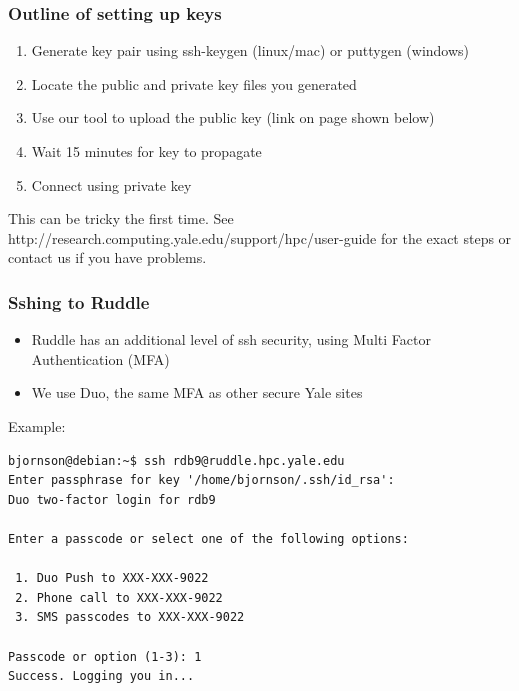 \documentclass[10pt]{beamer}
\begin{document}
\begin{frame}[fragile]

\frametitle{Outline of setting up keys}
\begin{enumerate}
\item Generate key pair using ssh-keygen (linux/mac) or puttygen (windows)
\item Locate the public and private key files you generated
\item Use our tool to upload the public key (link on page shown below)
\item Wait 15 minutes for key to propagate
\item Connect using private key
\end{enumerate}

This can be tricky the first time.  See http://research.computing.yale.edu/support/hpc/user-guide
for the exact steps or contact us if you have problems.

\end{frame}

\begin{frame}[fragile]
\frametitle{Sshing to Ruddle}

\begin{itemize}
\item Ruddle has an additional level of ssh security, using Multi Factor Authentication (MFA)
\item We use Duo, the same MFA as other secure Yale sites
\end{itemize}

Example:
\begin{verbatim}
bjornson@debian:~$ ssh rdb9@ruddle.hpc.yale.edu
Enter passphrase for key '/home/bjornson/.ssh/id_rsa': 
Duo two-factor login for rdb9

Enter a passcode or select one of the following options:

 1. Duo Push to XXX-XXX-9022
 2. Phone call to XXX-XXX-9022
 3. SMS passcodes to XXX-XXX-9022

Passcode or option (1-3): 1
Success. Logging you in...
\end{verbatim}  
\end{frame}
\end{document}

